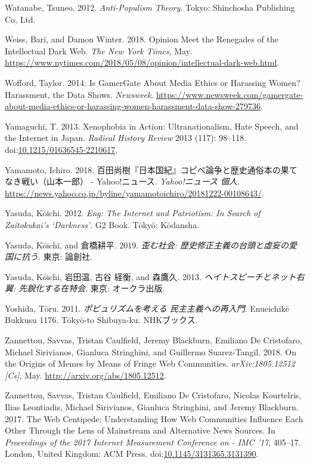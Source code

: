 \documentclass[10pt,british,A4paper,,openany]{memoir}
\begin{document}
\hypertarget{ref-watanabe_anti-populism_2012}{}
Watanabe, Tsuneo. 2012. \emph{Anti-Populism Theory}. Tokyo: Shinchosha
Publishing Co, Ltd.

\hypertarget{ref-weiss_opinion_2018}{}
Weiss, Bari, and Damon Winter. 2018. Opinion Meet the Renegades of the
Intellectual Dark Web. \emph{The New York Times}, May.
\url{https://www.nytimes.com/2018/05/08/opinion/intellectual-dark-web.html}.

\hypertarget{ref-wofford_is_2014}{}
Wofford, Taylor. 2014. Is GamerGate About Media Ethics or Harassing
Women? Harassment, the Data Shows. \emph{Newsweek}.
\url{https://www.newsweek.com/gamergate-about-media-ethics-or-harassing-women-harassment-data-show-279736}.

\hypertarget{ref-yamaguchi_xenophobia_2013}{}
Yamaguchi, T. 2013. Xenophobia in Action: Ultranationalism, Hate Speech,
and the Internet in Japan. \emph{Radical History Review} 2013 (117):
98--118.
doi:\href{https://doi.org/10.1215/01636545-2210617}{10.1215/01636545-2210617}.

\hypertarget{ref-yamamoto__2018}{}
Yamamoto, Ichiro. 2018.
百田尚樹『日本国紀』コピペ論争と歴史通俗本の果てなき戦い（山本一郎） -
Yahoo!ニュース. \emph{Yahoo!ニュース 個人}.
\url{https://news.yahoo.co.jp/byline/yamamotoichiro/20181222-00108643/}.

\hypertarget{ref-yasuda_eng:_2012}{}
Yasuda, Kōichi. 2012. \emph{Eng: The Internet and Patriotism: In Search
of Zaitokukai's `Darkness'}. G2 Book. Tōkyō: Kōdansha.

\hypertarget{ref-yasuda_:_2019}{}
Yasuda, Kōichi, and 倉橋耕平. 2019. \emph{歪む社会:
歴史修正主義の台頭と虛妄の愛国に抗う}. 東京: 論創社.

\hypertarget{ref-yasuda_:_2013}{}
Yasuda, Kōichi, 岩田温, 古谷 経衡, and 森鷹久. 2013.
\emph{ヘイトスピーチとネット右翼: 先銳化する在特会}. 東京: オークラ出版.

\hypertarget{ref-yoshida__2011}{}
Yoshida, Tōru. 2011. \emph{ポピュリズムを考える 民主主義への再入門}.
Enueichikē Bukkusu 1176. Tōkyō-to Shibuya-ku: NHKブックス.

\hypertarget{ref-zannettou_origins_2018}{}
Zannettou, Savvas, Tristan Caulfield, Jeremy Blackburn, Emiliano De
Cristofaro, Michael Sirivianos, Gianluca Stringhini, and Guillermo
Suarez-Tangil. 2018. On the Origins of Memes by Means of Fringe Web
Communities. \emph{arXiv:1805.12512 {[}Cs{]}}, May.
\url{http://arxiv.org/abs/1805.12512}.

\hypertarget{ref-zannettou_web_2017}{}
Zannettou, Savvas, Tristan Caulfield, Emiliano De Cristofaro, Nicolas
Kourtelris, Ilias Leontiadis, Michael Sirivianos, Gianluca Stringhini,
and Jeremy Blackburn. 2017. The Web Centipede: Understanding How Web
Communities Influence Each Other Through the Lens of Mainstream and
Alternative News Sources. In \emph{Proceedings of the 2017 Internet
Measurement Conference on - IMC '17}, 405--17. London, United Kingdom:
ACM Press.
doi:\href{https://doi.org/10.1145/3131365.3131390}{10.1145/3131365.3131390}.
\end{document}
